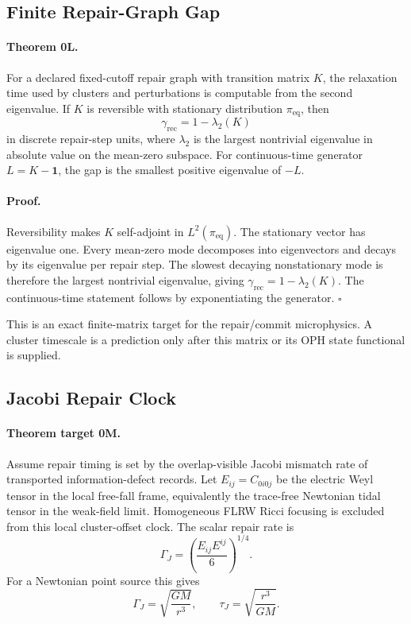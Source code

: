 \documentclass[11pt]{article}
\begin{document}
\subsection{Finite Repair-Graph Gap}

\paragraph{Theorem 0L.}
For a declared fixed-cutoff repair graph with transition matrix \(K\), the
relaxation time used by clusters and perturbations is computable from the
second eigenvalue.  If \(K\) is reversible with stationary distribution
\(\pi_{\mathrm{eq}}\), then
\begin{equation}
  \gamma_{\mathrm{rec}}=1-\lambda_2(K)
\end{equation}
in discrete repair-step units, where \(\lambda_2\) is the largest nontrivial
eigenvalue in absolute value on the mean-zero subspace.  For continuous-time
generator \(L=K-\mathbf 1\), the gap is the smallest positive eigenvalue of
\(-L\).

\paragraph{Proof.}
Reversibility makes \(K\) self-adjoint in
\(L^2(\pi_{\mathrm{eq}})\).  The stationary vector has eigenvalue one.  Every
mean-zero mode decomposes into eigenvectors and decays by its eigenvalue per
repair step.  The slowest decaying nonstationary mode is therefore the largest
nontrivial eigenvalue, giving \(\gamma_{\mathrm{rec}}=1-\lambda_2(K)\).  The
continuous-time statement follows by exponentiating the generator. \(\square\)

This is an exact finite-matrix target for the repair/commit microphysics.  A
cluster timescale is a prediction only after this matrix or its OPH state
functional is supplied.

\subsection{Jacobi Repair Clock}

\paragraph{Theorem target 0M.}
Assume repair timing is set by the overlap-visible Jacobi mismatch rate of
transported information-defect records.  Let \(E_{ij}=C_{0i0j}\) be the
electric Weyl tensor in the local free-fall frame, equivalently the trace-free
Newtonian tidal tensor in the weak-field limit.  Homogeneous FLRW Ricci
focusing is excluded from this local cluster-offset clock.  The scalar repair
rate is
\begin{equation}
  \Gamma_J
  =
  \left(\frac{E_{ij}E^{ij}}{6}\right)^{1/4}.
\end{equation}
For a Newtonian point source this gives
\begin{equation}
  \Gamma_J=\sqrt{\frac{GM}{r^3}},
  \qquad
  \tau_J=\sqrt{\frac{r^3}{GM}}.
\end{equation}
\end{document}
